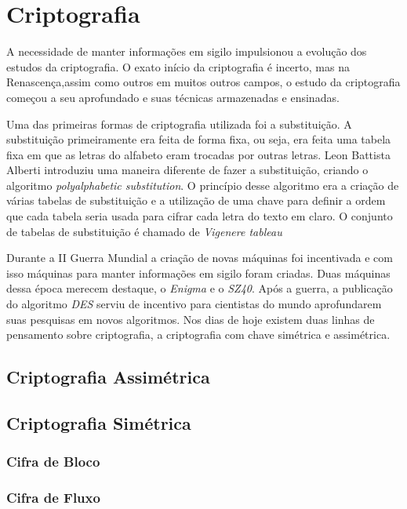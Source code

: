 \chapter{Criptografia}
\label{cryptograhy}

%
A necessidade de manter informações em sigilo impulsionou a evolução dos estudos da criptografia. O exato início da criptografia é incerto, mas na Renascença,assim como outros em muitos outros campos, o estudo da criptografia começou a seu aprofundado e suas técnicas armazenadas e ensinadas. ~\cite{donald-davies}

%
Uma das primeiras formas de criptografia utilizada foi a substituição. A substituição primeiramente era feita de forma fixa, ou seja, era feita uma tabela fixa em que as letras do alfabeto eram trocadas por outras letras. Leon Battista Alberti introduziu uma maneira diferente de fazer a substituição, criando o algoritmo \textit{polyalphabetic substitution}. O princípio desse algoritmo era a criação de várias tabelas de substituição e a utilização de uma chave para definir a ordem que cada tabela seria usada para cifrar cada letra do texto em claro. O conjunto de tabelas de substituição é chamado de \textit{Vigenere tableau}

%
Durante a II Guerra Mundial a criação de novas máquinas foi incentivada e com isso máquinas para manter informações em sigilo foram criadas. Duas máquinas dessa época merecem destaque, o \textit{Enigma} e o 	\textit{SZ40}. Após a guerra, a publicação do algoritmo \textit{DES} serviu de incentivo para cientistas do mundo aprofundarem suas pesquisas em novos algoritmos. Nos dias de hoje existem duas linhas de pensamento sobre criptografia, a criptografia com chave simétrica e assimétrica. 


\section{Criptografia Assimétrica}
\label{assymmetric-cryptography}

\section{Criptografia Simétrica}
\label{symmetric-cryptography}

\subsection{Cifra de Bloco}
\label{block-cipher}

\subsection{Cifra de Fluxo}
\label{stream-cipher}

